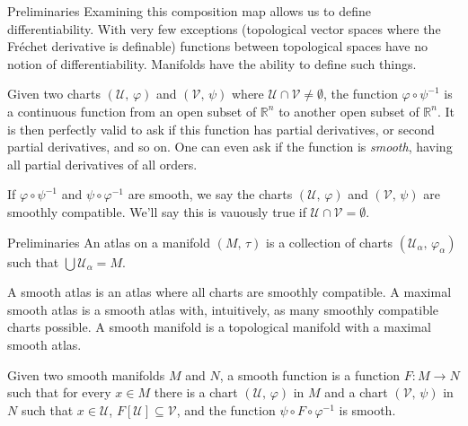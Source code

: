 \documentclass{beamer}
\begin{document}
    \begin{frame}{Preliminaries}
        Examining this composition map allows us to define differentiability.
        With very few exceptions (topological vector spaces where the
        Fr\'{e}chet derivative is definable) functions between topological
        spaces have no notion of differentiability. Manifolds have the ability
        to define such things.
        \par\hfill\par
        Given two charts $(\mathcal{U},\,\varphi)$ and $(\mathcal{V},\,\psi)$
        where $\mathcal{U}\cap\mathcal{V}\ne\emptyset$, the function
        $\varphi\circ\psi^{-1}$ is a continuous function from an open subset of
        $\mathbb{R}^{n}$ to another open subset of $\mathbb{R}^{n}$. It is then
        perfectly valid to ask if this function has partial derivatives, or
        second partial derivatives, and so on. One can even ask if the function
        is \textit{smooth}, having all partial derivatives of all orders.
        \par\hfill\par
        If $\varphi\circ\psi^{-1}$ and $\psi\circ\varphi^{-1}$ are smooth, we
        say the charts $(\mathcal{U},\,\varphi)$ and $(\mathcal{V},\,\psi)$ are
        smoothly compatible. We'll say this is vauously true if
        $\mathcal{U}\cap\mathcal{V}=\emptyset$.
    \end{frame}
    \begin{frame}{Preliminaries}
        An atlas on a manifold $(M,\,\tau)$ is a collection of charts
        $(\mathcal{U}_{\alpha},\,\varphi_{\alpha})$ such that
        $\bigcup\mathcal{U}_{\alpha}=M$.
        \par\hfill\par
        A smooth atlas is an atlas where all charts are smoothly compatible.
        A maximal smooth atlas is a smooth atlas with, intuitively, as many
        smoothly compatible charts possible. A smooth manifold is a topological
        manifold with a maximal smooth atlas.
        \par\hfill\par
        Given two smooth manifolds $M$ and $N$, a smooth function is a function
        $F:M\rightarrow{N}$ such that for every $x\in{M}$ there is a chart
        $(\mathcal{U},\,\varphi)$ in $M$ and a chart $(\mathcal{V},\,\psi)$ in
        $N$ such that $x\in\mathcal{U}$, $F[\mathcal{U}]\subseteq\mathcal{V}$,
        and the function $\psi\circ{F}\circ\varphi^{-1}$ is smooth.
    \end{frame}
\end{document}
